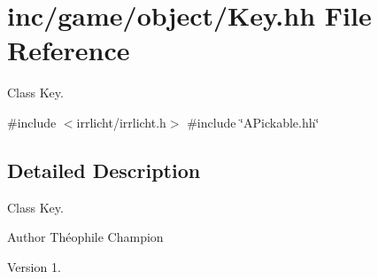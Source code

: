 \hypertarget{Key_8hh}{}\section{inc/game/object/\+Key.hh File Reference}
\label{Key_8hh}


Class Key.  


{\ttfamily \#include $<$irrlicht/irrlicht.\+h$>$}\newline
{\ttfamily \#include \char`\"{}A\+Pickable.\+hh\char`\"{}}\newline


\subsection{Detailed Description}
Class Key. 

\begin{DoxyAuthor}{Author}
Théophile Champion 
\end{DoxyAuthor}
\begin{DoxyVersion}{Version}
1. 
\end{DoxyVersion}
